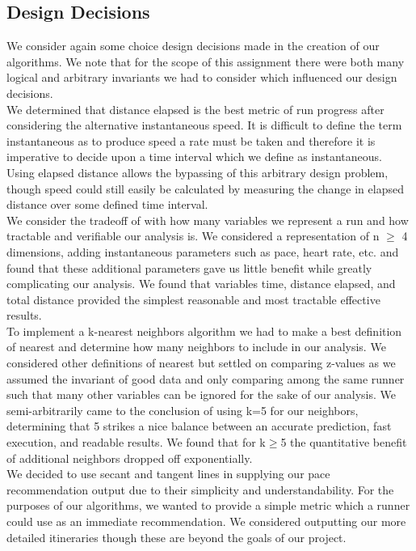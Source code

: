 \documentclass[twoside]{article}
\begin{document}
\begin{multicols}{2}
\subsection{Design Decisions}
	We consider again some choice design decisions made in the creation of our algorithms.  We note that for the scope of this assignment there were both many logical and arbitrary invariants we had to consider which influenced our design decisions.\\
	
	We determined that distance elapsed is the best metric of run progress after considering the alternative instantaneous speed.  It is difficult to define the term instantaneous as to produce speed a rate must be taken and therefore it is imperative to decide upon a time interval which we define as instantaneous.  Using elapsed distance allows the bypassing of this arbitrary design problem, though speed could still easily be calculated by measuring the change in elapsed distance over some defined time interval.\\
	
	We consider the tradeoff of with how many variables we represent a run and how tractable and verifiable our analysis is.  We considered a representation of n $\ge$ 4 dimensions, adding instantaneous parameters such as pace, heart rate, etc. and found that these additional parameters gave us little benefit while greatly complicating our analysis.  We found that variables time, distance elapsed, and total distance provided the simplest reasonable and most tractable effective results.\\
	
	To implement a k-nearest neighbors algorithm we had to make a best definition of nearest and determine how many neighbors to include in our analysis.  We considered other definitions of nearest but settled on comparing z-values as we assumed the invariant of good data and only comparing among the same runner such that many other variables can be ignored for the sake of our analysis.  We semi-arbitrarily came to the conclusion of using k=5 for our neighbors, determining that 5 strikes a nice balance between an accurate prediction, fast execution, and readable results.  We found that for k$\ge$5 the quantitative benefit of additional neighbors dropped off exponentially.\\
	
	We decided to use secant and tangent lines in supplying our pace recommendation output due to their simplicity and understandability. For the purposes of our algorithms, we wanted to provide a simple metric which a runner could use as an immediate recommendation.  We considered outputting our more detailed itineraries though these are beyond the goals of our project.\\




\end{multicols}
\end{document}
